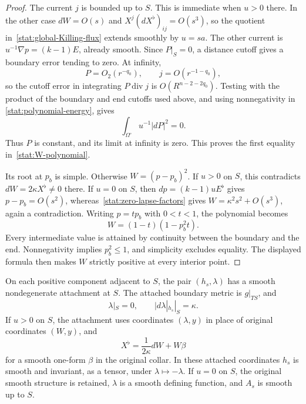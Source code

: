 \begin{proof}
The current $j$ is bounded up to $S$.  This is immediate when
$u>0$ there.  In the other case $dW=O(s)$ and
$X^j(dX^\flat)_{ij}=O(s^3)$, so the quotient
in~\eqref{stat:global-Killing-flux} extends smoothly by
$u=sa$.  The other current is
$u^{-1}\nabla p=(k-1)E$, already smooth.  Since $P|_S=0$, a
distance cutoff gives a boundary error tending to zero.  At
infinity,
\[
 P=O_2(r^{-q_0}),\qquad j=O(r^{-1-q_0}),
\]
so the cutoff error in integrating $P\operatorname{div}j$ is
$O(R^{n-2-2q_0})$.  Testing with the product of the boundary and
end cutoffs used above, and using nonnegativity in
\eqref{stat:polynomial-energy}, gives
\[
 \int_{\Omega^\circ}u^{-1}|dP|^2=0.
\]
Thus $P$ is constant, and its limit at infinity is zero.  This proves
the first equality in~\eqref{stat:W-polynomial}.

Its root at $p_b$ is simple.  Otherwise $W=(p-p_b)^2$.  If $u>0$
on $S$, this contradicts $dW=2\kappa X^\flat\ne0$ there.  If
$u=0$ on $S$, then $dp=(k-1)uE^\flat$ gives
$p-p_b=O(s^2)$, whereas~\eqref{stat:zero-lapse-factors} gives
$W=\kappa^2s^2+O(s^3)$, again a contradiction.
Writing $p=t p_b$ with $0<t<1$, the polynomial becomes
\[
 W=(1-t)(1-p_b^2t).
\]
Every intermediate value is attained by continuity between the
boundary and the end.  Nonnegativity implies $p_b^2\leq1$, and
simplicity excludes equality.  The displayed formula then makes
$W$ strictly positive at every interior point.
\end{proof}

\begin{lemma}
\label{stat:base-attachment}
On each positive component adjacent to $S$, the pair $(h_s,\lambda)$
has a smooth nondegenerate attachment at $S$.  The attached boundary
metric is $g|_{TS}$, and
\begin{equation}
 \lambda|_S=0,\qquad |d\lambda|_{h_s}|_S=\kappa.
 \label{stat:base-boundary-gradient}
\end{equation}
If $u>0$ on $S$, the attachment uses coordinates $(\lambda,y)$ in
place of original coordinates $(W,y)$, and
\begin{equation}
 X^\flat=\frac1{2\kappa}dW+W\beta
 \label{stat:positive-boundary-one-form}
\end{equation}
for a smooth one-form $\beta$ in the original collar.  In these
attached coordinates $h_s$ is smooth and invariant, as a tensor,
under $\lambda\mapsto-\lambda$.  If $u=0$ on $S$, the original
smooth structure is retained, $\lambda$ is a smooth defining
function, and $A_s$ is smooth up to $S$.
\end{lemma}

